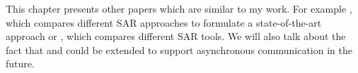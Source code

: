 This chapter presents other papers which are similar to my work.
For example \cite{Ducasse2009}, which compares different SAR approaches to formulate a state-of-the-art approach or \cite{Garcia2013comparative}, which compares different SAR tools.
We will also talk about the fact that \cite{Granchelli2017MicroART} and \cite{Langhammer2016} could be extended to support asynchronous communication in the future.